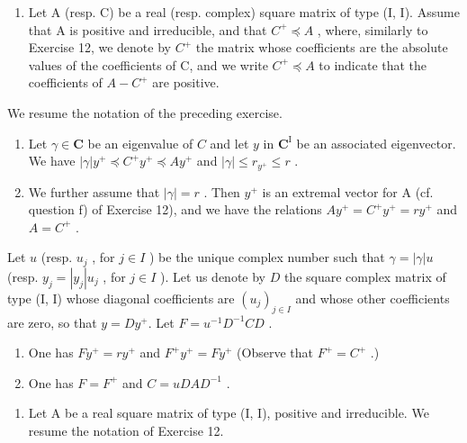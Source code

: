 \begin{enumerate}
\def\labelenumi{\arabic{enumi})}
\setcounter{enumi}{12}
\tightlist
\item
  Let A (resp. C) be a real (resp. complex) square matrix of type (I, I). Assume that A is positive and irreducible, and that \(C^{+} \preccurlyeq A\) , where, similarly to Exercise 12, we denote by \(C^{+}\) the matrix whose coefficients are the absolute values of the coefficients of C, and we write \(C^{+} \preccurlyeq A\) to indicate that the coefficients of \(A - C^{+}\) are positive.
\end{enumerate}

We resume the notation of the preceding exercise.

\begin{enumerate}
\def\labelenumi{\alph{enumi})}
\item
  Let \(\gamma \in \mathbf{C}\) be an eigenvalue of \(C\) and let \(y\) in \(\mathbf{C}^{\mathrm{I}}\) be an associated eigenvector. We have \(|\gamma|y^{+} \preccurlyeq C^{+}y^{+} \preccurlyeq Ay^{+}\) and \(|\gamma| \leqslant r_{y^{+}} \leqslant r\) .
\item
  We further assume that \(|\gamma| = r\) . Then \(y^{+}\) is an extremal vector for A (cf. question f) of Exercise 12), and we have the relations \(Ay^{+} = C^{+}y^{+} = ry^{+}\) and \(A = C^{+}\) .
\end{enumerate}

Let \(u\) (resp. \(u_j\) , for \(j \in I\) ) be the unique complex number such that \(\gamma = |\gamma|u\) (resp. \(y_j = |y_j|u_j\) , for \(j \in I\) ). Let us denote by \(D\) the square complex matrix of type (I, I) whose diagonal coefficients are \((u_j)_{j \in I}\) and whose other coefficients are zero, so that \(y = Dy^+\). Let \(F = u^{-1}D^{-1}CD\) .

\begin{enumerate}
\def\labelenumi{\alph{enumi})}
\setcounter{enumi}{2}
\item
  One has \(Fy^{+} = ry^{+}\) and \(F^{+}y^{+} = Fy^{+}\) (Observe that \(F^{+} = C^{+}\) .)
\item
  One has \(F = F^{+}\) and \(C = uDAD^{-1}\) .
\end{enumerate}

\begin{enumerate}
\def\labelenumi{\arabic{enumi})}
\setcounter{enumi}{13}
\tightlist
\item
  Let A be a real square matrix of type (I, I), positive and irreducible. We resume the notation of Exercise 12.
\end{enumerate}

